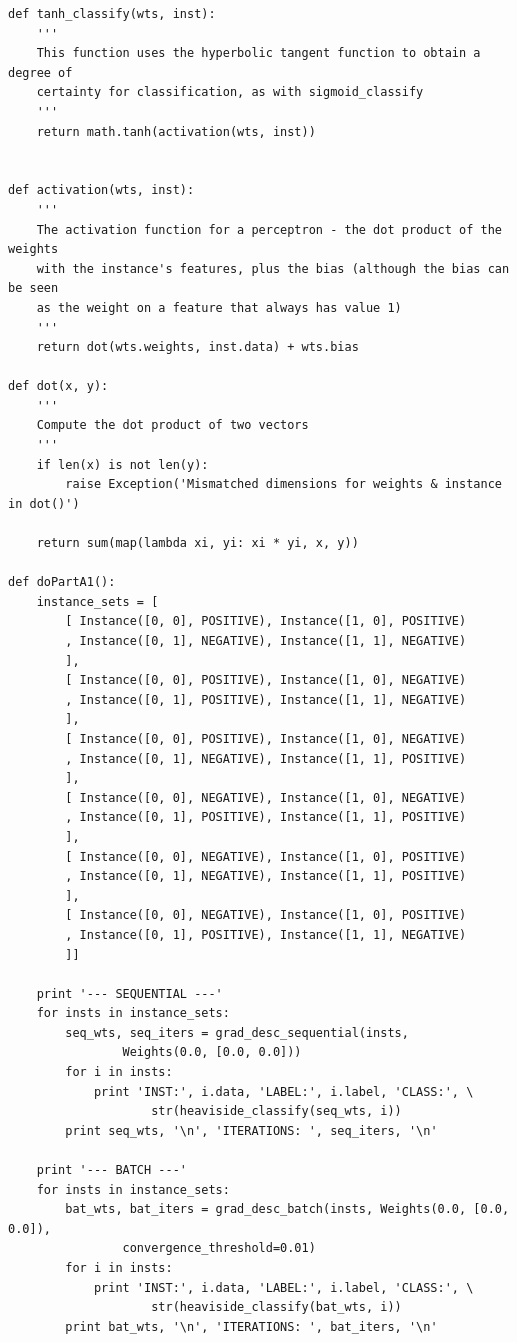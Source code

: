 \documentclass{article}
\begin{document}
\begin{verbatim}
def tanh_classify(wts, inst):
    '''
    This function uses the hyperbolic tangent function to obtain a degree of
    certainty for classification, as with sigmoid_classify
    '''
    return math.tanh(activation(wts, inst))


def activation(wts, inst):
    '''
    The activation function for a perceptron - the dot product of the weights
    with the instance's features, plus the bias (although the bias can be seen
    as the weight on a feature that always has value 1)
    '''
    return dot(wts.weights, inst.data) + wts.bias

def dot(x, y):
    '''
    Compute the dot product of two vectors
    '''
    if len(x) is not len(y):
        raise Exception('Mismatched dimensions for weights & instance in dot()')

    return sum(map(lambda xi, yi: xi * yi, x, y))

def doPartA1():
    instance_sets = [
        [ Instance([0, 0], POSITIVE), Instance([1, 0], POSITIVE)
        , Instance([0, 1], NEGATIVE), Instance([1, 1], NEGATIVE)
        ],
        [ Instance([0, 0], POSITIVE), Instance([1, 0], NEGATIVE)
        , Instance([0, 1], POSITIVE), Instance([1, 1], NEGATIVE)
        ],
        [ Instance([0, 0], POSITIVE), Instance([1, 0], NEGATIVE)
        , Instance([0, 1], NEGATIVE), Instance([1, 1], POSITIVE)
        ],
        [ Instance([0, 0], NEGATIVE), Instance([1, 0], NEGATIVE)
        , Instance([0, 1], POSITIVE), Instance([1, 1], POSITIVE)
        ],
        [ Instance([0, 0], NEGATIVE), Instance([1, 0], POSITIVE)
        , Instance([0, 1], NEGATIVE), Instance([1, 1], POSITIVE)
        ],
        [ Instance([0, 0], NEGATIVE), Instance([1, 0], POSITIVE)
        , Instance([0, 1], POSITIVE), Instance([1, 1], NEGATIVE)
        ]]

    print '--- SEQUENTIAL ---'
    for insts in instance_sets:
        seq_wts, seq_iters = grad_desc_sequential(insts,
                Weights(0.0, [0.0, 0.0]))
        for i in insts:
            print 'INST:', i.data, 'LABEL:', i.label, 'CLASS:', \
                    str(heaviside_classify(seq_wts, i))
        print seq_wts, '\n', 'ITERATIONS: ', seq_iters, '\n'

    print '--- BATCH ---'
    for insts in instance_sets:
        bat_wts, bat_iters = grad_desc_batch(insts, Weights(0.0, [0.0, 0.0]),
                convergence_threshold=0.01)
        for i in insts:
            print 'INST:', i.data, 'LABEL:', i.label, 'CLASS:', \
                    str(heaviside_classify(bat_wts, i))
        print bat_wts, '\n', 'ITERATIONS: ', bat_iters, '\n'


\end{verbatim}
\end{document}
